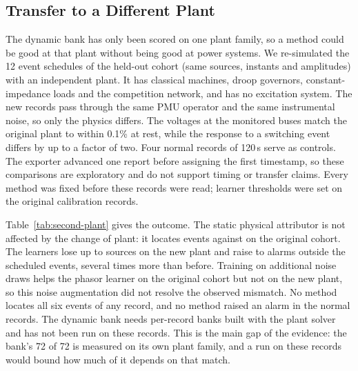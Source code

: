 \subsection{Transfer to a Different Plant}
\label{sec:second-plant}
The dynamic bank has only been scored on one plant family, so a method could be good at that plant without being good at power systems. We re-simulated the 12 event schedules of the held-out cohort (same sources, instants and amplitudes) with an independent plant. It has classical machines, droop governors, constant-impedance loads and the competition network, and has no excitation system. The new records pass through the same PMU operator and the same instrumental noise, so only the physics differs. The voltages at the monitored buses match the original plant to within 0.1\% at rest, while the response to a switching event differs by up to a factor of two. Four normal records of 120\,s serve as controls. The exporter advanced one
report before assigning the first timestamp, so these comparisons are
exploratory and do not support timing or transfer claims. Every method was fixed before these records were read; learner thresholds were set on the original calibration records.

Table~\ref{tab:second-plant} gives the outcome. The static physical attributor is not affected by the change of plant: it locates \SPStaticTop{} events against \SPStaticOrig{} on the original cohort. The learners lose up to \SPDrop{} sources on the new plant and raise \SPExtrasLo{} to \SPExtrasHi{} alarms outside the scheduled events, several times more than before. Training on additional noise draws helps the phasor learner on the original cohort but not on the new plant, so this noise augmentation did not resolve the observed mismatch. No method locates all six events of any record, and no method raised an alarm in the normal records. The dynamic bank needs per-record banks built with the plant solver and has not been run on these records. This is the main gap of the evidence: the bank's 72 of 72 is measured on its own plant family, and a run on these records would bound how much of it depends on that match.

